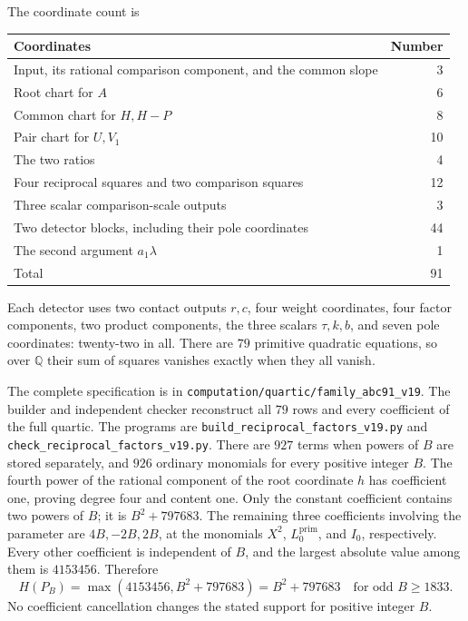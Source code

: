 \documentclass[11pt,a4paper]{article}
\newcommand{\Q}{\mathbb Q}\newcommand{\Z}{\mathbb Z}
\begin{document}
The coordinate count is
\begin{center}
\begin{tabular}{lr}
\toprule
Coordinates & Number\\\midrule
Input, its rational comparison component, and the common slope &3\\
Root chart for $A$ &6\\
Common chart for $H,H-P$ &8\\
Pair chart for $U,V_1$ &10\\
The two ratios &4\\
Four reciprocal squares and two comparison squares &12\\
Three scalar comparison-scale outputs &3\\
Two detector blocks, including their pole coordinates &44\\
The second argument $a_1\lambda$ &1\\\midrule
Total &91\\\bottomrule
\end{tabular}
\end{center}
Each detector uses two contact outputs $r,c$, four weight coordinates,
four factor components, two product components, the three scalars
$\tau,k,b$, and seven pole coordinates: twenty-two in all.
There are $79$ primitive quadratic equations, so over $\Q$ their
sum of squares vanishes exactly when they all vanish.

The complete specification is in
\nolinkurl{computation/quartic/family_abc91_v19}. The builder and independent
checker reconstruct all $79$ rows and every coefficient of the full
quartic. The programs are
\nolinkurl{build_reciprocal_factors_v19.py} and
\nolinkurl{check_reciprocal_factors_v19.py}. There are $927$ terms when powers of $B$ are stored separately,
and $926$ ordinary monomials for every positive integer $B$.
The fourth power of the rational component of the root coordinate $h$
has coefficient one, proving degree four and content one.
Only the constant coefficient contains two powers of $B$; it is
$B^2+797683$. The remaining three coefficients involving the parameter
are $4B,-2B,2B$, at the monomials $X^2$, $L_0^{\mathrm{prim}}$,
and $I_0$, respectively. Every other coefficient is independent of $B$,
and the largest absolute value among them is $4153456$. Therefore
\[
 H(P_B)=\max(4153456,B^2+797683)
       =B^2+797683\quad\text{for odd }B\ge1833.
\]
No coefficient cancellation changes the stated support for positive integer $B$.
\end{document}
